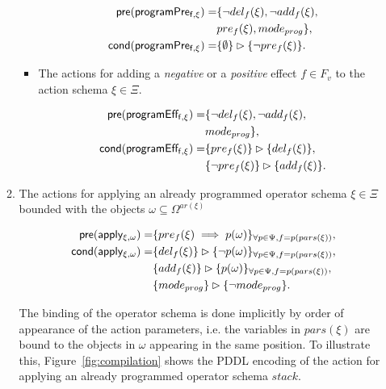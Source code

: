 \documentclass[letterpaper]{article} %
\newcommand{\pre}{\mathsf{pre}}     %
\newcommand{\cond}{\mathsf{cond}}   %
\begin{document}
\begin{itemize}
\begin{enumerate}
\begin{itemize}
\begin{small}
\begin{align*}
\hspace*{7pt}\pre(\mathsf{programPre_{f,\xi}})=&\{\neg del_{f}(\xi),\neg add_{f}(\xi),\\
& pre_{f}(\xi), mode_{prog}\},\\    
\cond(\mathsf{programPre_{f,\xi}})=&\{\emptyset\}\rhd\{\neg pre_{f}(\xi)\}.
\end{align*}
\end{small}

\item The actions for adding a {\em negative} or a {\em positive} effect $f\in F_v$ to the action schema $\xi\in\Xi$.

\begin{small}
\begin{align*}
\hspace*{7pt}\pre(\mathsf{programEff_{f,\xi}})=&\{\neg del_{f}(\xi),\neg add_{f}(\xi),\\                                                   
& mode_{prog}\},\\ 
\cond(\mathsf{programEff_{f,\xi}})=&\{pre_{f}(\xi)\}\rhd\{del_{f}(\xi)\},\\
&\{\neg pre_{f}(\xi)\}\rhd\{add_{f}(\xi)\}.
\end{align*}
\end{small}
\end{itemize}

\item The actions for applying an already programmed operator schema $\xi\in\Xi$ bounded with the objects $\omega\subseteq\Omega^{ar(\xi)}$
\begin{small}
\begin{align*}
\hspace*{7pt}\pre(\mathsf{apply_{\xi,\omega}})=&\{pre_{f}(\xi)\implies p(\omega)\}_{\forall p\in\Psi,f=p(pars(\xi))},\\
\cond(\mathsf{apply_{\xi,\omega}})=&\{del_{f}(\xi)\}\rhd\{\neg p(\omega)\}_{\forall p\in\Psi,f=p(pars(\xi))},\\
&\{add_{f}(\xi)\}\rhd\{p(\omega)\}_{\forall p\in\Psi,f=p(pars(\xi))},\\
&\{mode_{prog}\}\rhd\{\neg mode_{prog}\}.
\end{align*}
\end{small}

The binding of the operator schema is done implicitly by order of appearance of the action parameters, i.e. the variables in $pars(\xi)$ are bound to the objects in $\omega$ appearing in the same position. To illustrate this, Figure~\ref{fig:compilation} shows the PDDL encoding of the action for applying an already programmed operator schema $stack$.


\end{enumerate}
\end{itemize}
\end{document}
